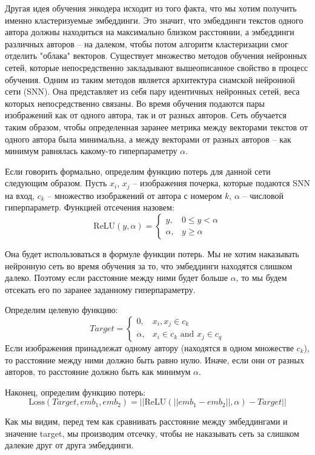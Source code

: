     Другая идея обучения энкодера исходит из того факта, что мы хотим получить именно кластеризуемые эмбеддинги. Это значит, что эмбеддинги текстов одного автора должны находиться на максимально близком расстоянии, а эмбеддинги различных авторов -- на далеком, чтобы потом алгоритм кластеризации смог отделить "облака" векторов. Существует множество методов обучения нейронных сетей, которые непосредственно закладывают вышеописанное свойство в процесс обучения. Одним из таким методов является архитектура сиамской нейронной сети (SNN). Она представляет из себя пару идентичных нейронных сетей, веса которых непосредственно связаны. Во время обучения подаются пары изображений как от одного автора, так и от разных авторов. Сеть обучается таким образом, чтобы определенная заранее метрика между векторами текстов от одного автора была минимальна, а между векторами от разных авторов -- как минимум равнялась какому-то гиперпараметру $\alpha$. 

    Если говорить формально, определим функцию потерь для данной сети следующим образом. Пусть
$x_i$, $x_j$ -- изображения почерка, которые подаются SNN на вход, $c_k$ -- множество изображений от автора с номером $k$, $\alpha$ -- числовой гиперпараметр. Функцией отсечения назовем: 
$$
    \text{ReLU}(y, \alpha) = 
\begin{cases}
    y,& 0 \le y < \alpha \\
    \alpha,& y \geq \alpha
\end{cases}
$$

\bigbreak
\noindent
Она будет использоваться в формуле функции потерь. Мы не хотим наказывать нейронную сеть во время обучения за то, что эмбеддинги находятся слишком далеко. Поэтому если расстояние между ними будет больше $\alpha$, то мы будем отсекать его по заранее заданному гиперпараметру. 

\noindent
Определим целевую функцию:
$$
Target =
\begin{cases}
    0,& x_i, x_j \in c_k \\
    \alpha,& x_i \in c_k \text{ and } x_j \in c_q
\end{cases}
$$
Если изображения принадлежат одному автору (находятся в одном множестве $c_k$), то расстояние между ними должно быть равно нулю. Иначе, если они от разных авторов, то расстояние должно быть как минимум $\alpha$. 

\noindent
Наконец, определим функцию потерь:
$$\text{Loss}(Target, emb_1, emb_2) = ||\text{ReLU}(|| emb_1 - emb_2 ||, \alpha) - Target||$$

\noindent
Как мы видим, перед тем как сравнивать расстояние между эмбеддингами и значение target, мы производим отсечку, чтобы не наказывать сеть за слишком далекие друг от друга эмбеддинги.

